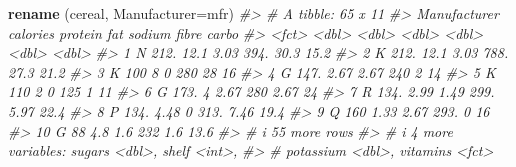 \documentclass[
]{book}
\newenvironment{Shaded}{\begin{snugshade}}{\end{snugshade}}
\newcommand{\AttributeTok}[1]{\textcolor[rgb]{0.13,0.29,0.53}{#1}}
\newcommand{\CommentTok}[1]{\textcolor[rgb]{0.56,0.35,0.01}{\textit{#1}}}
\newcommand{\FunctionTok}[1]{\textcolor[rgb]{0.13,0.29,0.53}{\textbf{#1}}}
\newcommand{\NormalTok}[1]{#1}
\begin{document}
\begin{Shaded}
\begin{Highlighting}[]
\FunctionTok{rename}\NormalTok{ (cereal, }\AttributeTok{Manufacturer=}\NormalTok{mfr)}
\CommentTok{\#\textgreater{} \# A tibble: 65 x 11}
\CommentTok{\#\textgreater{}    Manufacturer calories protein   fat sodium fibre carbo}
\CommentTok{\#\textgreater{}    \textless{}fct\textgreater{}           \textless{}dbl\textgreater{}   \textless{}dbl\textgreater{} \textless{}dbl\textgreater{}  \textless{}dbl\textgreater{} \textless{}dbl\textgreater{} \textless{}dbl\textgreater{}}
\CommentTok{\#\textgreater{}  1 N                212.   12.1   3.03   394. 30.3   15.2}
\CommentTok{\#\textgreater{}  2 K                212.   12.1   3.03   788. 27.3   21.2}
\CommentTok{\#\textgreater{}  3 K                100     8     0      280  28     16  }
\CommentTok{\#\textgreater{}  4 G                147.    2.67  2.67   240   2     14  }
\CommentTok{\#\textgreater{}  5 K                110     2     0      125   1     11  }
\CommentTok{\#\textgreater{}  6 G                173.    4     2.67   280   2.67  24  }
\CommentTok{\#\textgreater{}  7 R                134.    2.99  1.49   299.  5.97  22.4}
\CommentTok{\#\textgreater{}  8 P                134.    4.48  0      313.  7.46  19.4}
\CommentTok{\#\textgreater{}  9 Q                160     1.33  2.67   293.  0     16  }
\CommentTok{\#\textgreater{} 10 G                 88     4.8   1.6    232   1.6   13.6}
\CommentTok{\#\textgreater{} \# i 55 more rows}
\CommentTok{\#\textgreater{} \# i 4 more variables: sugars \textless{}dbl\textgreater{}, shelf \textless{}int\textgreater{},}
\CommentTok{\#\textgreater{} \#   potassium \textless{}dbl\textgreater{}, vitamins \textless{}fct\textgreater{}}


\end{Highlighting}
\end{Shaded}
\end{document}

